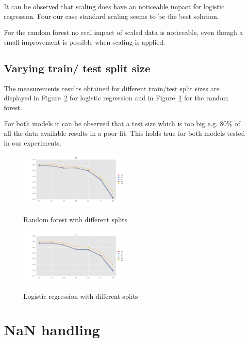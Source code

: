 \documentclass{sig-alternate-05-2015}
\begin{document}
It can be observed that scaling does have an noticeable impact for logistic regression. Four our case standard scaling seems to be the best solution. 


For the random forest no real impact of scaled data is noticeable, even though a small improvement is possible when scaling is applied.

\subsection{Varying train/ test split size}

The measurements results obtained for different train/test split sizes are displayed in Figure~\ref{fig:lr_splits} for logistic regression and in Figure~\ref{fig:rf_splits} for the random forest.
 
For both models it can be observed that a test size which is too big e.g. 80\% of all the data available results in a poor fit.
This holds true for both models tested in our experiments.

\begin{figure}[h]
  \centering
  \caption{Random forest with different splits}
  \includegraphics[width=0.5\textwidth]{../plots/RF_split}
  \label{fig:rf_splits}
\end{figure}


\begin{figure}[h]
  \centering
  \caption{Logistic regression with different splits}
  \includegraphics[width=0.5\textwidth]{../plots/LR_split}
  \label{fig:lr_splits}
\end{figure}

\section{NaN handling}
\end{document}
